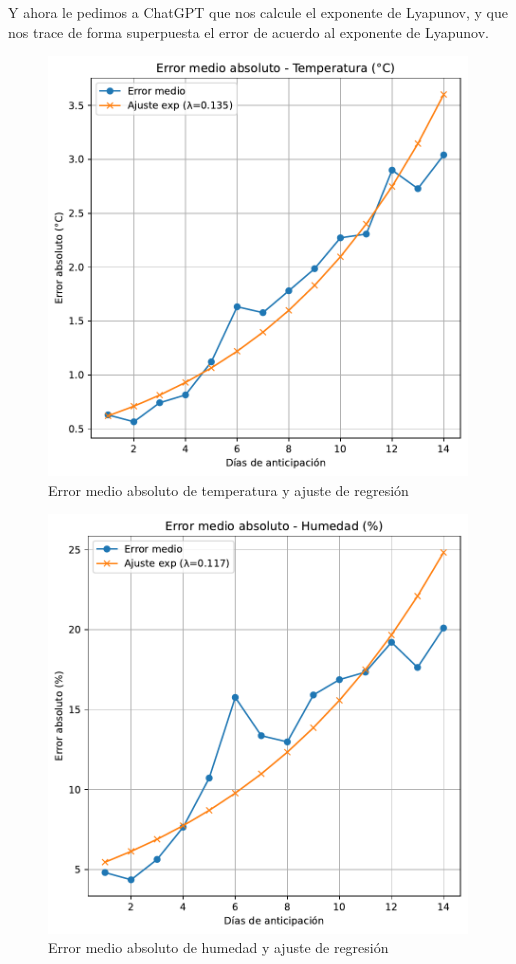 \documentclass[
  10pt,
  a4paper,
  DIV=11,
  numbers=noendperiod,
  open=any]{scrreprt}
\numberwithin{equation}{chapter}
\numberwithin{equation}{section}
\renewcommand{\[}{\begin{equation}}
\renewcommand{\]}{\end{equation}}
\begin{document}
Y ahora le pedimos a ChatGPT que nos calcule el exponente de Lyapunov, y
que nos trace de forma superpuesta el error de acuerdo al exponente de
Lyapunov.


\begin{figure}[h]
  \centering
  \includegraphics[width=0.99\textwidth]{03-meteorologia/predicciones_files/figure-pdf/cell-4-output-1.pdf}
  \caption{Error medio absoluto de temperatura y ajuste de regresión}
\end{figure}

\begin{figure}[h]
  \centering
  \includegraphics[width=0.99\textwidth]{03-meteorologia/predicciones_files/figure-pdf/cell-4-output-2.pdf}
  \caption{Error medio absoluto de humedad y ajuste de regresión}
\end{figure}
\end{document}
